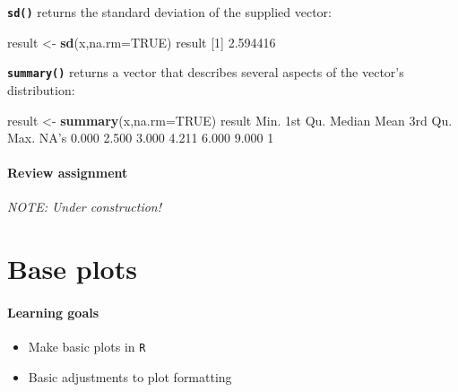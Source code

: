 \documentclass[
]{book}
\newenvironment{Shaded}{\begin{snugshade}}{\end{snugshade}}
\newcommand{\DataTypeTok}[1]{\textcolor[rgb]{0.13,0.29,0.53}{#1}}
\newcommand{\DecValTok}[1]{\textcolor[rgb]{0.00,0.00,0.81}{#1}}
\newcommand{\FloatTok}[1]{\textcolor[rgb]{0.00,0.00,0.81}{#1}}
\newcommand{\KeywordTok}[1]{\textcolor[rgb]{0.13,0.29,0.53}{\textbf{#1}}}
\newcommand{\NormalTok}[1]{#1}
\newcommand{\OtherTok}[1]{\textcolor[rgb]{0.56,0.35,0.01}{#1}}
\newcommand{\StringTok}[1]{\textcolor[rgb]{0.31,0.60,0.02}{#1}}
\providecommand{\tightlist}{%
  \setlength{\itemsep}{0pt}\setlength{\parskip}{0pt}}
\begin{document}
\textbf{\texttt{sd()}} returns the standard deviation of the supplied vector:

\begin{Shaded}
\begin{Highlighting}[]
\NormalTok{result <-}\StringTok{ }\KeywordTok{sd}\NormalTok{(x,}\DataTypeTok{na.rm=}\OtherTok{TRUE}\NormalTok{)}
\NormalTok{result}
\NormalTok{[}\DecValTok{1}\NormalTok{] }\FloatTok{2.594416}
\end{Highlighting}
\end{Shaded}

\textbf{\texttt{summary()}} returns a vector that describes several aspects of the vector's distribution:

\begin{Shaded}
\begin{Highlighting}[]
\NormalTok{result <-}\StringTok{ }\KeywordTok{summary}\NormalTok{(x,}\DataTypeTok{na.rm=}\OtherTok{TRUE}\NormalTok{)}
\NormalTok{result}
\NormalTok{   Min. 1st Qu.  Median    Mean 3rd Qu.    Max.    NA}\StringTok{'s }
\StringTok{  0.000   2.500   3.000   4.211   6.000   9.000       1 }
\end{Highlighting}
\end{Shaded}

\hypertarget{review-assignment-4}{%
\subsubsection*{Review assignment}\label{review-assignment-4}}

\emph{NOTE: Under construction!}

\hypertarget{base-plots}{%
\chapter{Base plots}\label{base-plots}}

\hypertarget{learning-goals-5}{%
\subsubsection*{Learning goals}\label{learning-goals-5}}

\begin{itemize}
\tightlist
\item
  Make basic plots in \texttt{R}
\item
  Basic adjustments to plot formatting
\end{itemize}
\end{document}
